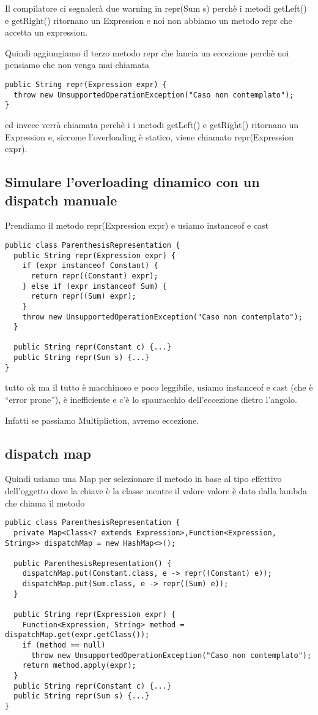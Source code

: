 Il compilatore ci segnalerà due warning in repr(Sum s) perchè i metodi getLeft() e getRight() ritornano un Expression e noi non abbiamo un metodo repr che 
accetta un expression.

Quindi aggiungiamo il terzo metodo repr che lancia un eccezione perchè noi pensiamo che non venga mai chiamata
\begin{lstlisting}
public String repr(Expression expr) {
  throw new UnsupportedOperationException("Caso non contemplato");
}   
\end{lstlisting}

ed invece verrà chiamata perchè i i metodi getLeft() e getRight() ritornano un Expression e, siccome l'overloading è statico, viene chiamato repr(Expression expr).

\subsection{Simulare l’overloading dinamico con un dispatch manuale}

Prendiamo il metodo repr(Expression expr) e usiamo instanceof e cast
\begin{lstlisting}
public class ParenthesisRepresentation {
  public String repr(Expression expr) {
    if (expr instanceof Constant) {
      return repr((Constant) expr);
    } else if (expr instanceof Sum) {
      return repr((Sum) expr);
    }
    throw new UnsupportedOperationException("Caso non contemplato");
  }
  
  public String repr(Constant c) {...}
  public String repr(Sum s) {...}
}
\end{lstlisting}

tutto ok ma il tutto è macchinoso e poco leggibile, usiamo instanceof e cast (che è “error prone”), è inefficiente e c'è lo spauracchio dell'eccezione dietro 
l'angolo.

Infatti se passiamo Multipliction, avremo eccezione.

\subsection{dispatch map}

Quindi usiamo una Map per selezionare il metodo in base al tipo effettivo dell’oggetto dove la chiave è la classe mentre il valore valore è dato dalla lambda 
che chiama il metodo
\begin{lstlisting}
public class ParenthesisRepresentation {
  private Map<Class<? extends Expression>,Function<Expression, String>> dispatchMap = new HashMap<>();

  public ParenthesisRepresentation() {
    dispatchMap.put(Constant.class, e -> repr((Constant) e));
    dispatchMap.put(Sum.class, e -> repr((Sum) e));
  }

  public String repr(Expression expr) {
    Function<Expression, String> method = dispatchMap.get(expr.getClass());
    if (method == null)
      throw new UnsupportedOperationException("Caso non contemplato");
    return method.apply(expr);
  }
  public String repr(Constant c) {...}
  public String repr(Sum s) {...}
}
\end{lstlisting}

